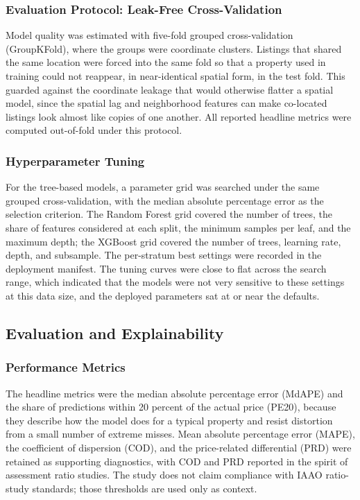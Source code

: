 \subsubsection{Evaluation Protocol: Leak-Free Cross-Validation}\label{evaluation-protocol}

Model quality was estimated with five-fold grouped cross-validation (GroupKFold), where the groups were coordinate clusters. Listings that shared the same location were forced into the same fold so that a property used in training could not reappear, in near-identical spatial form, in the test fold. This guarded against the coordinate leakage that would otherwise flatter a spatial model, since the spatial lag and neighborhood features can make co-located listings look almost like copies of one another. All reported headline metrics were computed out-of-fold under this protocol.

\subsubsection{Hyperparameter Tuning}\label{hyperparameter-tuning}

For the tree-based models, a parameter grid was searched under the same grouped cross-validation, with the median absolute percentage error as the selection criterion. The Random Forest grid covered the number of trees, the share of features considered at each split, the minimum samples per leaf, and the maximum depth; the XGBoost grid covered the number of trees, learning rate, depth, and subsample. The per-stratum best settings were recorded in the deployment manifest. The tuning curves were close to flat across the search range, which indicated that the models were not very sensitive to these settings at this data size, and the deployed parameters sat at or near the defaults.


\subsection{Evaluation and Explainability}\label{evaluation-and-explainability}

\subsubsection{Performance Metrics}\label{performance-metrics}

The headline metrics were the median absolute percentage error (MdAPE) and the share of predictions within 20 percent of the actual price (PE20), because they describe how the model does for a typical property and resist distortion from a small number of extreme misses. Mean absolute percentage error (MAPE), the coefficient of dispersion (COD), and the price-related differential (PRD) were retained as supporting diagnostics, with COD and PRD reported in the spirit of assessment ratio studies. The study does not claim compliance with IAAO ratio-study standards; those thresholds are used only as context.

